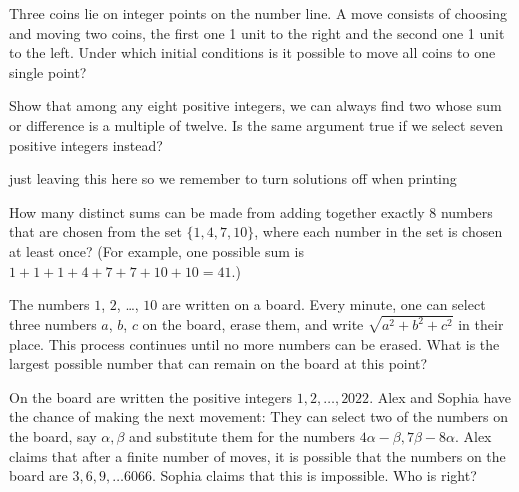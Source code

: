\begin{problem}
    Three coins lie on integer points on the number line. A move consists of choosing and moving two coins, the first one 1 unit to the right and the second one 1 unit to the left. Under which initial conditions is it possible to move all coins to one single point?
\end{problem}

\begin{problem}
    Show that among any eight positive integers, we can always find two whose sum or difference is a multiple of twelve. Is the same argument true if we select seven positive integers instead?
\end{problem}

\begin{solution}
    just leaving this here so we remember to turn solutions off when printing
\end{solution}

\begin{problem}
    How many distinct sums can be made from adding together exactly 8 numbers that are chosen from the set $\{1,4,7,10\}$, where each number in the set is chosen at least once? (For example, one possible sum is $1 + 1 + 1 + 4 + 7 + 7 + 10 + 10 = 41$.)
\end{problem}

\begin{problem}
     The numbers $1$, $2$, \dots, $10$ are written on a board.
  Every minute, one can select three numbers
  $a$, $b$, $c$ on the board, erase them,
  and write $\sqrt{a^2+b^2+c^2}$ in their place.
  This process continues until no more numbers can be erased.
  What is the largest possible number
  that can remain on the board at this point?
\end{problem}


\begin{problem}[C][4][Cuba 2022/6]
    On the board are written the positive integers $1, 2, \ldots, 2022$. Alex and Sophia have the chance of making the next movement:
    They can select two of the numbers on the board, say $\alpha, \beta$ and substitute them for the numbers $4 \alpha - \beta, 7 \beta - 8 \alpha$. Alex claims that after a finite number of moves, it is possible that the numbers on the board are $3, 6, 9, \ldots 6066$. Sophia claims that this is impossible. Who is right?
\end{problem}

